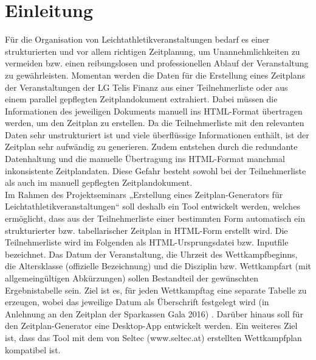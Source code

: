 
\chapter{Einleitung}
\label{chap:Einleitung}

Für die Organisation von Leichtathletikveranstaltungen bedarf es einer strukturierten und vor allem richtigen Zeitplanung, um Unannehmlichkeiten zu vermeiden bzw. einen reibungslosen und professionellen Ablauf der Veranstaltung zu gewährleisten. Momentan werden die Daten für die Erstellung eines Zeitplans der Veranstaltungen der LG Telis Finanz aus einer Teilnehmerliste oder aus einem parallel gepflegten Zeitplandokument extrahiert. Dabei müssen die Informationen des jeweiligen Dokuments manuell ins \ac{HTML}-Format übertragen werden, um den Zeitplan zu erstellen. Da die Teilnehmerliste mit den relevanten Daten sehr unstrukturiert ist und viele überflüssige Informationen enthält, ist der Zeitplan sehr aufwändig zu generieren. Zudem entstehen durch die redundante Datenhaltung und die manuelle Übertragung ins HTML-Format manchmal inkonsistente Zeitplandaten. Diese Gefahr besteht sowohl bei der Teilnehmerliste als auch im manuell gepflegten Zeitplandokument. \\
Im Rahmen des Projektseminars „Erstellung eines Zeitplan-Generators für Leichtathletikveranstaltungen“ soll deshalb ein Tool entwickelt werden, welches ermöglicht, dass aus der Teilnehmerliste einer bestimmten Form automatisch ein strukturierter bzw. tabellarischer Zeitplan in HTML-Form erstellt wird. Die Teilnehmerliste wird im Folgenden als \ac{HTML}-Ursprungsdatei bzw. Inputfile bezeichnet. Das Datum der Veranstaltung, die Uhrzeit des Wettkampfbeginns, die Altersklasse (offizielle Bezeichnung) und die Disziplin bzw. Wettkampfart (mit allgemeingültigen Abkürzungen) sollen Bestandteil der gewünschten Ergebnistabelle sein. Ziel ist es, für jeden Wettkampftag eine separate Tabelle zu erzeugen, wobei das jeweilige Datum als Überschrift festgelegt wird (in Anlehnung an den Zeitplan der Sparkassen Gala 2016) \cite{gala}.
Darüber hinaus soll für den Zeitplan-Generator eine Desktop-App entwickelt werden. Ein weiteres Ziel ist, dass das Tool mit dem von Seltec (www.seltec.at) erstellten Wettkampfplan kompatibel ist.\\
